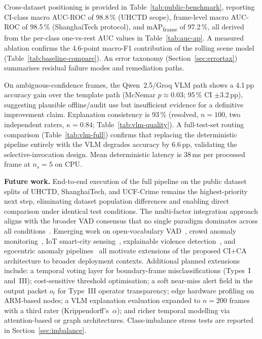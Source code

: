 \documentclass[sensors,article,submit,pdftex,moreauthors]{Definitions/mdpi}
\begin{document}
Cross-dataset positioning is provided in Table~\ref{tab:public-benchmark}, reporting CI-class macro AUC-ROC of 98.8\,\% (UHCTD scope), frame-level macro AUC-ROC of 98.5\,\% (ShanghaiTech protocol), and mAP\textsubscript{frame} of 97.2\,\%, all derived from the per-class one-vs-rest AUC values in Table~\ref{tab:auc-ap}. A measured ablation confirms the 4.6-point macro-F1 contribution of the rolling scene model (Table~\ref{tab:baseline-compare}). An error taxonomy (Section~\ref{sec:errortax}) summarises residual failure modes and remediation paths.
 
On ambiguous-confidence frames, the Qwen~2.5/Groq VLM path shows a 4.1\,pp accuracy gain over the template path (McNemar $p{\approx}0.03$; 95\,\% CI $\pm$3.2\,pp), suggesting plausible offline/audit use but insufficient evidence for a definitive improvement claim. Explanation consistency is 93\,\% (resolved, $n=100$, two independent raters, $\kappa=0.84$; Table~\ref{tab:vlm-quality}). A full-test-set routing comparison (Table~\ref{tab:vlm-full}) confirms that replacing the deterministic pipeline entirely with the VLM degrades accuracy by 6.6\,pp, validating the selective-invocation design. Mean deterministic latency is 38\,ms per processed frame at $n_s{=}5$ on CPU.
 
 
\textbf{Future work.} End-to-end execution of the full pipeline on the public dataset splits of UHCTD, ShanghaiTech, and UCF-Crime remains the highest-priority next step, eliminating dataset population differences and enabling direct comparison under identical test conditions. The multi-factor integration approach aligns with the broader VAD consensus that no single paradigm dominates across all conditions~\cite{liu2024generalized}. Emerging work on open-vocabulary VAD~\cite{wu2024openworld}, crowd anomaly monitoring~\cite{yang2024crowd}, IoT smart-city sensing~\cite{mancy2025swiniot,alzahrani2026real}, explainable violence detection~\cite{azim2026violence}, and egocentric anomaly pipelines~\cite{flaborea2024multimodal} all motivate extensions of the proposed CI+CA architecture to broader deployment contexts. Additional planned extensions include: a temporal voting layer for boundary-frame misclassifications (Types~I and~III); cost-sensitive threshold optimisation; a soft near-miss alert field in the output packet $o_t$ for Type~III operator transparency; edge hardware profiling on ARM-based nodes; a VLM explanation evaluation expanded to $n=200$ frames with a third rater (Krippendorff's~$\alpha$); and richer temporal modelling via attention-based or graph architectures. Class-imbalance stress tests are reported in Section~\ref{sec:imbalance}.
 
\end{document}
